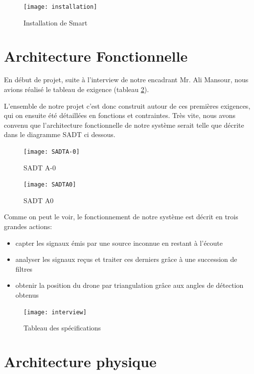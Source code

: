 \begin{figure}[!h]
  \centering
  \texttt{[image: installation]}
  \caption{Installation de Smart}
  \label{fig:inst}
\end{figure}


\section{Architecture Fonctionnelle}
En début de projet, suite à l'interview de notre encadrant Mr. Ali Mansour, nous avions réalisé le tableau de exigence (tableau \ref{pdf:tab}).


L'ensemble de notre projet c'est donc construit autour de ces premières exigences, qui on ensuite été détaillées en fonctions et contraintes. Très vite, nous avons convenu que l'architecture fonctionnelle de notre système serait telle que décrite dans le diagramme SADT ci dessous.

\begin{figure}[h]

    \centering
    \texttt{[image: SADTA-0]}
    \caption{SADT A-0}
    
\end{figure}
\begin{figure}[h]
      
    
    \centering
    \texttt{[image: SADTA0]}
    \caption{SADT A0}

\end{figure}




Comme on peut le voir, le fonctionnement de notre système est décrit en trois grandes actions: 
\begin{itemize}
\item capter les signaux émis par une source inconnue en restant à l'écoute
\item analyser les signaux reçus et traiter ces derniers grâce à une succession de filtres
\item obtenir la position du drone par triangulation grâce aux angles de détection obtenus
\end{itemize}


\begin{figure}[h]
  \centering
  \texttt{[image: interview]}
  \caption{Tableau des spécifications}
  \label{pdf:tab}
\end{figure}

 




\section{Architecture physique}
\label{sec:phys}


